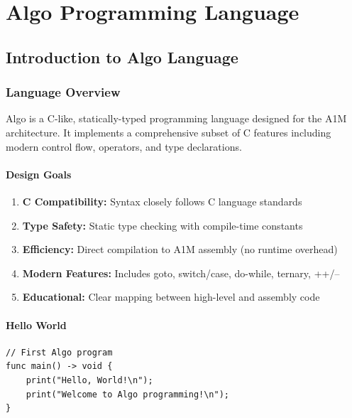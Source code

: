 \documentclass[12pt,a4paper,oneside]{book}
\begin{document}
\part{Algo Programming Language}

\chapter{Introduction to Algo Language}

\section{Language Overview}

Algo is a C-like, statically-typed programming language designed for the A1M architecture. It implements a comprehensive subset of C features including modern control flow, operators, and type declarations.

\subsection{Design Goals}

\begin{enumerate}[itemsep=8pt]
    \item \textbf{C Compatibility:} Syntax closely follows C language standards
    \item \textbf{Type Safety:} Static type checking with compile-time constants
    \item \textbf{Efficiency:} Direct compilation to A1M assembly (no runtime overhead)
    \item \textbf{Modern Features:} Includes goto, switch/case, do-while, ternary, ++/--
    \item \textbf{Educational:} Clear mapping between high-level and assembly code
\end{enumerate}

\subsection{Hello World}

\begin{lstlisting}[style=algo, caption={Hello World Program}]
// First Algo program
func main() -> void {
    print("Hello, World!\n");
    print("Welcome to Algo programming!\n");
}
\end{lstlisting}
\end{document}
